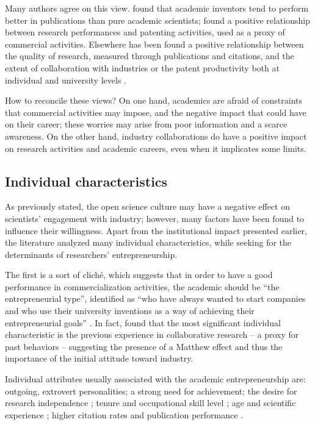 Many authors agree on this view. \citet{Meyer2006} found that academic inventors tend to perform better in publications than pure academic scientists; \citet{Wong2010} found a positive relationship between research performances and patenting activities, used as a proxy of commercial activities. Elsewhere has been found a positive relationship between the quality of research, measured through publications and citations, and the extent of collaboration with industries \citep{AzagraCaro2010} or the patent productivity both at individual and university levels \citep{Baldini2007}.

How to reconcile these views? On one hand, academics are afraid of constraints that commercial activities may impose, and the negative impact that could have on their career; these worries may arise from poor information and a scarce awareness. On the other hand, industry collaborations do have a positive impact on research activities and academic careers, even when it implicates some limits.

\subsection{Individual characteristics}

As previously stated, the open science culture may have a negative effect on scientists' engagement with industry; however, many factors have been found to influence their willingness. Apart from the institutional impact presented earlier, the literature analyzed many individual characteristics, while seeking for the determinants of researchers' entrepreneurship.

The first is a sort of cliché, which suggests that in order to have a good performance in commercialization activities, the academic should be \enquote{the entrepreneurial type}, identified as \enquote{who have always wanted to start companies and who use their university inventions as a way of achieving their entrepreneurial goals} \citep{Fini2009}. In fact, \citet{DEste2007} found that the most significant individual characteristic is the previous experience in collaborative research – a proxy for past behaviors – suggesting the presence of a Matthew effect and thus the importance of the initial attitude toward industry.

Individual attributes usually associated with the academic entrepreneurship are: outgoing, extrovert personalities; a strong need for achievement; the desire for research independence \citep{OShea2004}; tenure and occupational skill level \citep{Roberts1991}; age and scientific experience \citep{Audretsch2000}; higher citation rates and publication performance \citep{Zucker2001}.

